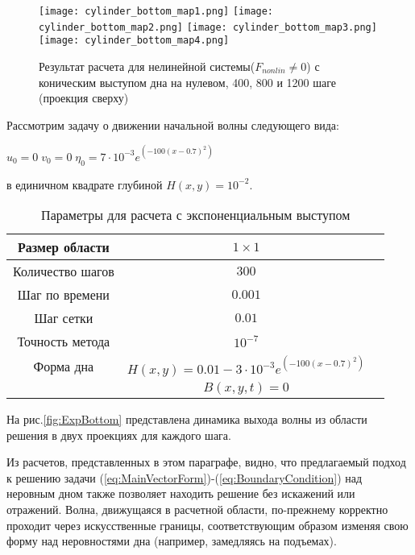 \newpage
\begin{figure}[htp]
    \centering
    \vspace{12em}
    \texttt{[image: cylinder\_bottom\_map1.png]}
    \texttt{[image: cylinder\_bottom\_map2.png]}
    \texttt{[image: cylinder\_bottom\_map3.png]}
    \texttt{[image: cylinder\_bottom\_map4.png]}
    \caption{Результат расчета для нелинейной системы($F_{nonlin}\neq 0$) с коническим выступом дна на нулевом, 400, 800 и 1200 шаге (проекция сверху)}
    \label{fig:CylinderBottomMap}
\end{figure}

\newpage
Рассмотрим задачу о движении начальной волны следующего вида:

$u_0=0\;v_0=0\;\eta_0=7 \cdot 10^{-3}e^{(-100 (x-0.7)^2)}$

в единичном квадрате глубиной $H(x,y)=10^{-2}$.

\begin{table}[H]
    \label{tab:FirstResult}
    \caption{Параметры для расчета с экспоненциальным выступом}
    \begin{center}
	\begin{tabular}{|c|c|c|}
	    \hline
	    Размер области & $1\times1$\\
	    \hline
	    Количество шагов & $300$\\
	    \hline
	    Шаг по времени & $0.001$\\
	    \hline
	    Шаг сетки & $0.01$\\
	    \hline
	    Точность метода & $10^{-7}$\\
	    \hline
	    Форма дна & $H(x,y)=0.01-3 \cdot 10^{-3}e^{(-100 (x-0.7)^2)}$\\
	    & $B(x,y,t)=0$\\
	    \hline
	\end{tabular}
    \end{center}
\end{table}

На рис.\ref{fig:ExpBottom} представлена динамика выхода волны из области решения в двух проекциях для каждого шага.

Из расчетов, представленных в этом параграфе, видно, что предлагаемый подход к решению задачи (\ref{eq:MainVectorForm})-(\ref{eq:BoundaryCondition}) над неровным дном также позволяет находить решение без искажений или отражений. Волна, движущаяся в расчетной области, по-прежнему корректно проходит через искусственные границы, соответствующим образом изменяя свою форму над неровностями дна (например, замедляясь на подъемах).

